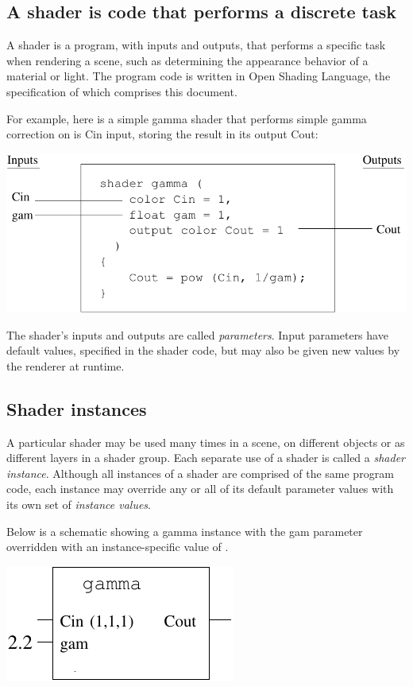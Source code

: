 \documentclass[11pt,letterpaper]{book}
\def\langname{Open Shading Language\xspace}
\begin{document}
\subsection*{A shader is code that performs a discrete task}

A shader is a program, with inputs and outputs, that performs a specific
task when rendering a scene, such as determining the appearance behavior
of a material or light.  The program code is written in \langname, the
specification of which comprises this document.

For example, here is a simple {\cf gamma} shader that performs
simple gamma correction on is {\cf Cin} input, storing the result
in its output {\cf Cout}:
\bigskip

\includegraphics{Figures/shaderschematic}

\medskip

The shader's inputs and outputs are called \emph{parameters}.  Input
parameters have default values, specified in the shader code, but may
also be given new values by the renderer at runtime.  

\subsection*{Shader instances}

A particular shader may be used many times in a scene, on different
objects or as different layers in a shader group.  Each separate use of
a shader is called a \emph{shader instance}.  Although all instances of
a shader are comprised of the same program code, each instance may
override any or all of its default parameter values with its own set of
\emph{instance values}.

Below is a
schematic showing a {\cf gamma} instance with the {\cf gam} parameter
overridden with an instance-specific value of {}.

\bigskip

\bigspc\spc \includegraphics{Figures/instanceschematic}
\end{document}
